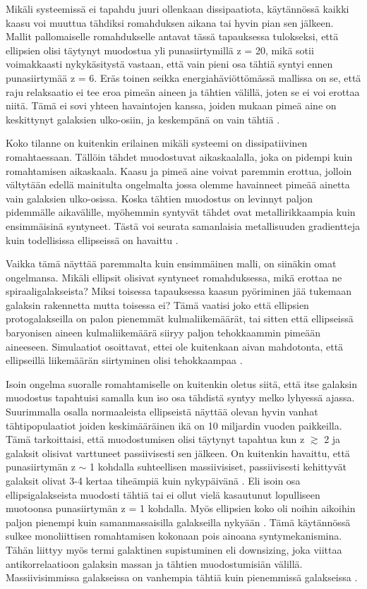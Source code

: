\documentclass[12pt,a4paper]{article}
\begin{document}
Mikäli systeemissä ei tapahdu juuri ollenkaan dissipaatiota, käytännössä kaikki kaasu voi muuttua tähdiksi romahduksen aikana tai hyvin pian sen jälkeen. Mallit pallomaiselle romahdukselle antavat tässä tapauksessa tulokseksi, että ellipsien olisi täytynyt muodostua yli punasiirtymillä z = 20, mikä sotii voimakkaasti nykykäsitystä vastaan, että vain pieni osa tähtiä syntyi ennen punasiirtymää z = 6. Eräs toinen seikka energiahäviöttömässä mallissa on se, että raju relaksaatio ei tee eroa pimeän aineen ja tähtien välillä, joten se ei voi erottaa niitä. Tämä ei sovi yhteen havaintojen kanssa, joiden mukaan pimeä aine on keskittynyt galaksien ulko-osiin, ja keskempänä on vain tähtiä \citep{galform}.

Koko tilanne on kuitenkin erilainen mikäli systeemi on dissipatiivinen romahtaessaan. Tällöin tähdet muodostuvat aikaskaalalla, joka on pidempi kuin romahtamisen aikaskaala. Kaasu ja pimeä aine voivat paremmin erottua, jolloin vältytään edellä mainitulta ongelmalta jossa olemme havainneet pimeää ainetta vain galaksien ulko-osissa. Koska tähtien muodostus on levinnyt paljon pidemmälle aikavälille, myöhemmin syntyvät tähdet ovat metallirikkaampia kuin ensimmäisinä syntyneet. Tästä voi seurata samanlaisia metallisuuden gradientteja kuin todellisissa ellipseissä on havaittu \citep{larson:1974}.

Vaikka tämä näyttää paremmalta kuin ensimmäinen malli, on siinäkin omat ongelmansa. Mikäli ellipsit olisivat syntyneet romahduksessa, mikä erottaa ne spiraaligalakseista? Miksi toisessa tapauksessa kaasun pyöriminen jää tukemaan galaksin rakennetta mutta toisessa ei? Tämä vaatisi joko että ellipsien protogalakseilla on palon pienemmät kulmaliikemäärät, tai sitten että ellipseissä baryonisen aineen kulmaliikemäärä siiryy paljon tehokkaammin pimeään aineeseen. Simulaatiot osoittavat, ettei ole kuitenkaan aivan mahdotonta, että ellipseillä liikemäärän siirtyminen olisi tehokkaampaa \citep{katz:1991, katz:1992}.

Isoin ongelma suoralle romahtamiselle on kuitenkin oletus siitä, että itse galaksin muodostus tapahtuisi samalla kun iso osa tähdistä syntyy melko lyhyessä ajassa. Suurimmalla osalla normaaleista ellipseistä näyttää olevan hyvin vanhat tähtipopulaatiot joiden keskimääräinen ikä on 10 miljardin vuoden paikkeilla. Tämä tarkoittaisi, että muodostumisen olisi täytynyt tapahtua kun z $\gtrsim$ 2 ja galaksit olisivat varttuneet passiivisesti sen jälkeen. On kuitenkin havaittu, että punasiirtymän z $\sim$ 1 kohdalla suhteellisen massiivisiset, passiivisesti kehittyvät galaksit olivat 3-4 kertaa tiheämpiä kuin nykypäivänä \citep{bell:2004, brown:2007, faber:2007, taylor:2009}. Eli isoin osa ellipsigalakseista muodosti tähtiä tai ei ollut vielä kasautunut lopulliseen muotoonsa punasiirtymän z = 1 kohdalla. Myös ellipsien koko oli noihin aikoihin paljon pienempi kuin samanmassaisilla galakseilla nykyään \citep{daddi:2005, trujillo:2006, dokkum:2008, wel:2008}. Tämä käytännössä sulkee monoliittisen romahtamisen kokonaan pois ainoana syntymekanismina. Tähän liittyy myös termi galaktinen supistuminen eli downsizing, joka viittaa antikorrelaatioon galaksin massan ja tähtien muodostumisiän välillä. Massiivisimmissa galakseissa on vanhempia tähtiä kuin pienemmissä galakseissa \citep{johansson:2012}.
\end{document}
